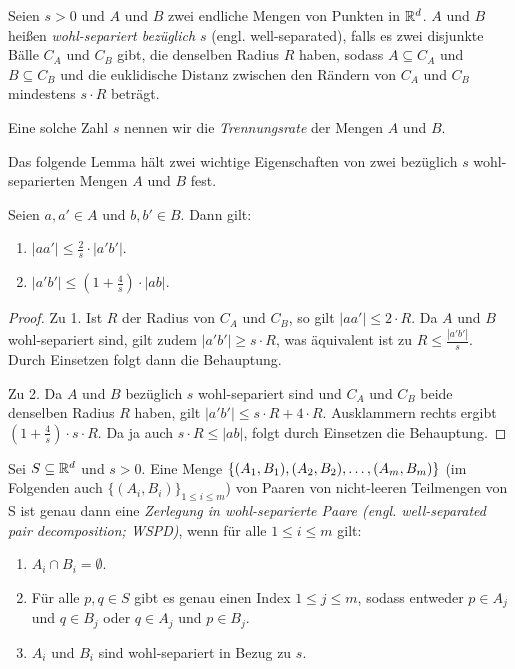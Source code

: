 \begin{definition}
   	\label{def:wellsep}
   	Seien $s > 0$ und $A$ und $B$ zwei endliche Mengen von Punkten in $\mathbb{R}^d$. 
   	$A$ und $B$ heißen \emph{wohl-separiert bezüglich $s$} (engl. well-separated), falls es zwei disjunkte Bälle $C_A$ und $C_B$ gibt, die denselben Radius $R$ haben, sodass $A \subseteq C_A$ und $B \subseteq C_B$ und die euklidische Distanz zwischen den Rändern von $C_A$ und $C_B$ mindestens $s\cdot R$ beträgt.

	Eine solche Zahl $s$ nennen wir die \emph{Trennungsrate} der Mengen $A$ und $B$.
\end{definition}

Das folgende Lemma hält zwei wichtige Eigenschaften von zwei bezüglich $s$ wohl-separierten Mengen $A$ und $B$ fest.
\begin{lemma}
   	\label{lem:wellsep}
	Seien $a, a' \in A$ und $b, b' \in B$. Dann gilt:
	\begin{enumerate}
		\item $\displaystyle |aa'| \leq \frac{2}{s}\cdot|a'b'|$.
		\item $\displaystyle |a'b'| \leq (1+\frac{4}{s})\cdot|ab|$.
	\end{enumerate}
\end{lemma}
\begin{proof}
   	Zu 1. Ist $R$ der Radius von $C_A$ und $C_B$, so gilt $|aa'| \leq 2 \cdot R$. Da $A$ und $B$ wohl-separiert sind, gilt zudem $|a'b'| \geq s \cdot R$, was äquivalent ist zu $R \leq \frac{|a'b'|}{s}$. Durch Einsetzen folgt dann die Behauptung.
   	
   	Zu 2. Da $A$ und $B$ bezüglich $s$ wohl-separiert sind und $C_A$ und $C_B$ beide denselben Radius $R$ haben, gilt $|a'b'| \leq s \cdot R + 4 \cdot R$. Ausklammern rechts ergibt $(1 + \frac{4}{s}) \cdot s \cdot R$. Da ja auch $s \cdot R \leq |ab|$, folgt durch Einsetzen die Behauptung.
\end{proof}

\begin{definition}[WSPD]
   	\label{def:wspd}
   	Sei $S \subseteq \mathbb{R}^d$ und $s > 0$. 
   	Eine Menge $ \{(A_1, B_1), (A_2, B_2), \mathellipsis, (A_m, B_m)\}$ (im Folgenden auch $\{(A_i, B_i)\}_{1 \leq i \leq m}$) von Paaren von nicht-leeren Teilmengen von S ist genau dann eine \emph{Zerlegung in wohl-separierte Paare (engl. well-separated pair decomposition; WSPD)}, wenn für alle $1 \leq i \leq m$ gilt:
   	\begin{enumerate}[label={(\arabic*)}, itemsep=0mm]
   		\item $A_i \cap B_i = \emptyset$.
   		\item Für alle $p, q \in S$ gibt es genau einen Index $1 \leq j \leq m$, sodass entweder $p \in A_j$ und $q \in B_j$ oder $q \in A_j$ und $p \in B_j$.
   		\item $A_i$ und $B_i$ sind wohl-separiert in Bezug zu $s$.
   	\end{enumerate}
\end{definition}

